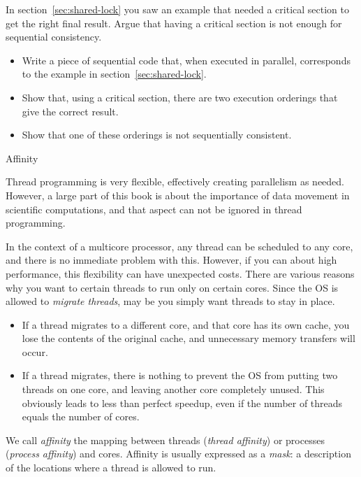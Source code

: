\begin{exercise}
  In section~\ref{sec:shared-lock} you saw an example that needed
  a critical section to get the right final result. Argue that
  having a critical section is not enough for sequential consistency.
  \begin{itemize}
  \item Write a piece of sequential code that, when executed in parallel,
    corresponds to the example in section~\ref{sec:shared-lock}.
  \item Show that, using a critical section, there are two execution
    orderings that give the correct result.
  \item Show that one of these orderings is not sequentially consistent.
  \end{itemize}
\end{exercise}

 {Affinity}

Thread programming is very flexible, effectively creating parallelism
as needed. However, a large part of this book is about the importance
of data movement in scientific computations, and that aspect can not
be ignored in thread programming.

In the context of a multicore processor, any thread can be scheduled
to any core, and there is no immediate problem with this. However, if
you can about high performance, this flexibility can have unexpected
costs. There are various reasons why you want to certain threads to
run only on certain cores. Since the \ac{OS} is allowed to
\emph{migrate threads}, may be you simply want
threads to stay in place.

\begin{itemize}
\item If a thread migrates to a different core, and that core has its
  own cache, you lose the contents of the original cache, and
  unnecessary memory transfers will occur.
\item If a thread migrates, there is nothing to prevent the OS from
  putting two threads on one core, and leaving another core completely
  unused. This obviously leads to less than perfect speedup, even if
  the number of threads equals the number of cores.
\end{itemize}

We call \emph{affinity} the mapping between
threads (\emph{thread affinity})
or processes (\emph{process
  affinity}) and cores.
Affinity is usually expressed as a \emph{mask}: a
description of the locations where a thread is allowed to run.

